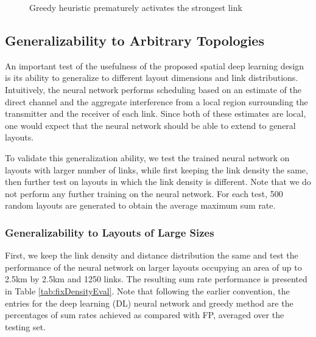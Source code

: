 \documentclass[journal,12pt,onecolumn,draftclsnofoot,]{IEEEtran}
\begin{document}
\begin{figure}
    \fi
    \caption{Greedy heuristic prematurely activates the strongest link}
    \label{fig:greedyprematureproblem}
\end{figure}


\subsection{Generalizability to Arbitrary Topologies}

An important test of the usefulness of the proposed spatial deep learning
design is its ability to generalize to different layout dimensions and link
distributions.  Intuitively, the neural network performs scheduling based on 
an estimate of the direct channel and the aggregate interference from a local
region surrounding the transmitter and the receiver of each link. Since both of
these estimates are local, one would expect that the neural network should be
able to extend to general layouts.

To validate this generalization ability, we test the trained neural network on
layouts with larger number of links, while first keeping the link density the
same, then further test on layouts in which the link density is different. Note
that we do not perform any further training on the neural network. For each test, 500 random layouts are generated to obtain the average maximum sum rate. 

\subsubsection{Generalizability to Layouts of Large Sizes}
First, we keep the link density and distance distribution the same and test the
performance of the neural network on larger layouts occupying an area of
up to 2.5km by 2.5km and 1250 links. The resulting sum
rate performance is presented in Table
\ref{tab:fixDensityEval}. Note that following the earlier convention, the
entries for the deep learning (DL) neural network and greedy method are the
percentages of sum rates achieved as compared with FP, averaged over the
testing set.
\end{document}
